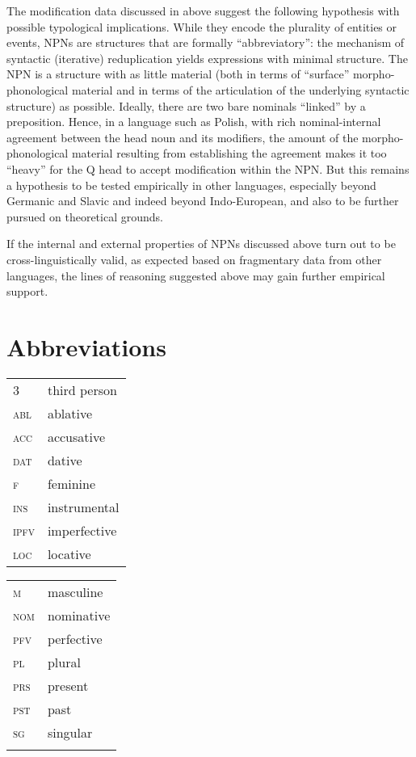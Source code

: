 \documentclass[output=paper]{langscibook}
\begin{document}
The modification data discussed in  above suggest the following hypothesis with possible typological implications. While they encode the plurality of entities or events, NPNs are structures that are formally ``abbreviatory'': the mechanism of syntactic (iterative) reduplication yields expressions with minimal structure. The NPN is a structure with as little material (both in terms of ``surface'' morpho-phonological material and in terms of the articulation of the underlying syntactic structure) as possible. Ideally, there are two bare nominals ``linked'' by a preposition. Hence, in a language such as Polish, with rich nominal-internal agreement between the head noun and its modifiers, the amount of the morpho-phonological material resulting from establishing the agreement makes it too ``heavy'' for the Q head to accept modification within the NPN. But this remains a hypothesis to be tested empirically in other languages, especially beyond Germanic and Slavic and indeed beyond Indo-European, and also to be further pursued on theoretical grounds.

If the internal and external properties of NPNs discussed above turn out to be cross-linguistically valid, as expected based on fragmentary data from other languages, the lines of reasoning suggested above may gain further empirical support.

\section*{Abbreviations}

\begin{tabularx}{.5\textwidth}{@{}lX@{}}
\textsc{3} & third person\\
\textsc{abl} & ablative\\
\textsc{acc} & accusative\\
\textsc{dat} & dative\\
\textsc{f} & feminine\\
\textsc{ins} & instrumental\\
\textsc{ipfv} & imperfective\\
\textsc{loc} & locative\\
\end{tabularx}%
\begin{tabularx}{.5\textwidth}{@{}lX@{}}
      \textsc{m} & masculine\\
      \textsc{nom} & nominative\\
      \textsc{pfv} & perfective\\
      \textsc{pl} & plural\\
      \textsc{prs} & present\\
      \textsc{pst} & past\\
      \textsc{sg} & singular\\
      &\\
\end{tabularx}
\end{document}
